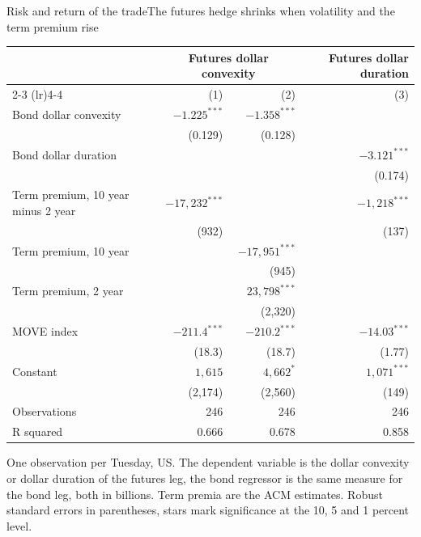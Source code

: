 \documentclass[aspectratio=169,11pt]{beamer}
\begin{document}
\begin{frame}{Risk and return of the trade}{The futures hedge shrinks when volatility and the term premium rise}
  \vspace{-0.6em}
  \begin{center}\tiny
  \begin{tabular}{lrrr}
    \toprule
    & \multicolumn{2}{c}{Futures dollar convexity} & Futures dollar duration \\
    \cmidrule(lr){2-3} \cmidrule(lr){4-4}
    & (1) & (2) & (3) \\
    \midrule
    Bond dollar convexity & $-1.225^{***}$ & $-1.358^{***}$ & \\
                          & (0.129) & (0.128) & \\
    Bond dollar duration  & & & $-3.121^{***}$ \\
                          & & & (0.174) \\
    Term premium, 10 year minus 2 year & $-17{,}232^{***}$ & & $-1{,}218^{***}$ \\
                          & (932) & & (137) \\
    Term premium, 10 year & & $-17{,}951^{***}$ & \\
                          & & (945) & \\
    Term premium, 2 year  & & $23{,}798^{***}$ & \\
                          & & (2{,}320) & \\
    MOVE index            & $-211.4^{***}$ & $-210.2^{***}$ & $-14.03^{***}$ \\
                          & (18.3) & (18.7) & (1.77) \\
    Constant              & $1{,}615$ & $4{,}662^{*}$ & $1{,}071^{***}$ \\
                          & (2{,}174) & (2{,}560) & (149) \\
    \midrule
    Observations & 246 & 246 & 246 \\
    R squared    & 0.666 & 0.678 & 0.858 \\
    \bottomrule
  \end{tabular}
  \end{center}
  {\tiny\color{slate} One observation per Tuesday, US. The dependent variable is the dollar convexity or dollar duration of the futures leg, the bond regressor is the same measure for the bond leg, both in billions. Term premia are the ACM estimates. Robust standard errors in parentheses, stars mark significance at the 10, 5 and 1 percent level.\par}
\end{frame}
\end{document}

